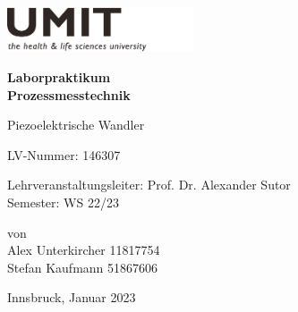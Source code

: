 \documentclass[11pt,oneside,bibtotoc,liststotoc]{scrbook}
\begin{document}
\thispagestyle{empty}
\graphicspath{{images/}}
\kern-13.5mm\includegraphics[width=55mm]{image/Titel/logo_umit.pdf}
 


\vspace*{2cm}\par
\begin{center}

{\huge \textbf{ Laborpraktikum}} \\[1em]
{\huge \textbf{Prozessmesstechnik}}
\vspace{2cm}\par

{\large Piezoelektrische Wandler}
\vspace{1cm}\par
{\large LV-Nummer: 146307}
\vspace{1cm}\par
Lehrveranstaltungsleiter: Prof. Dr. Alexander Sutor \\
Semester: WS 22/23



von \\[1ex]
Alex Unterkircher  11817754 \\
Stefan Kaufmann    51867606 
\vspace{1cm}\par

Innsbruck, Januar 2023

\end{center}



\thispagestyle{empty}

\setcounter{page}{1}
\renewcommand{\baselinestretch}{1.00}\normalsize
\tableofcontents
\listoffigures
\listoftables
\renewcommand{\baselinestretch}{1.5}\normalsize
\newpage
\setcounter{page}{1}

 
\newpage

\newpage

\newpage

\newpage







\clearpage

%
\end{document}
